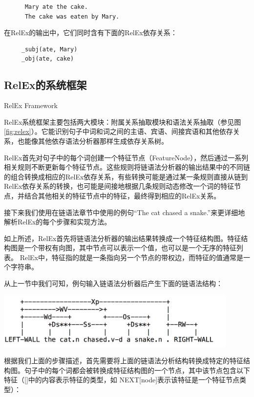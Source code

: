 \begin{verbatim}
      Mary ate the cake.
      The cake was eaten by Mary. 
\end{verbatim}

在RelEx的输出中，它们同时含有下面的RelEx依存关系：

\begin{verbatim}
     _subj(ate, Mary)
     _obj(ate, cake)
\end{verbatim}

\subsection{RelEx的系统框架}{RelEx Framework}

RelEx系统框架主要包括两大模块：附属关系抽取模块和语法关系抽取（参见图\ref{fig:relex}）。它能识别句子中词和词之间的主语、宾语、间接宾语和其他依存关系，也能像其他依存语法分析器那样生成依存关系树。 

RelEx首先对句子中的每个词创建一个特征节点（FeatureNode），然后通过一系列相关规则不断更新每个特征节点。这些规则将链语法分析器的输出结果中的不同链的组合转换成相应的RelEx依存关系，有些转换可能是通过某一条规则直接从链到RelEx依存关系的转换，也可能是间接地根据几条规则动态修改一个词的特征节点，并结合其他相关的特征节点中的特征，最终得到相应的RelEx关系。

接下来我们使用在链语法章节中使用的例句“The cat chased a snake.”来更详细地解析RelEx的每个步骤和实现方法。


如上所述，RelEx首先将链语法分析器的输出结果转换成一个特征结构图。特征结构图是一个带权有向图，其中节点可以表示一个值，也可以是一个无序的特征列表。 RelEx中，特征指的就是一条指向另一个节点的带权边，而特征的值通常是一个字符串。

从上一节中我们可知，例句输入链语法分析器后产生下面的链语法结构： 

\includegraphics[width=12cm]{figures/catSnake.png}

根据我们上面的步骤描述，首先需要将上面的链语法分析结构转换成特定的特征结构图。句子中的每个词都会被转换成特征结构图的一个节点，其中该节点包含以下特征（[]中的内容表示特征的类型，如 NEXT[node]表示该特征是一个特征节点类型）：

